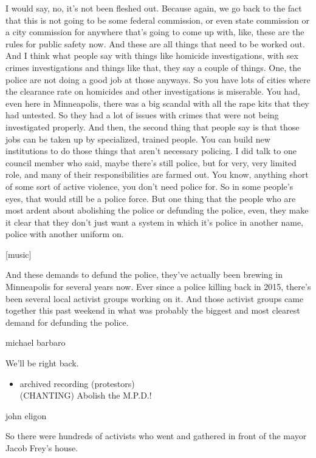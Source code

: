I would say, no, it's not been fleshed out. Because again, we go back to
the fact that this is not going to be some federal commission, or even
state commission or a city commission for anywhere that's going to come
up with, like, these are the rules for public safety now. And these are
all things that need to be worked out. And I think what people say with
things like homicide investigations, with sex crimes investigations and
things like that, they say a couple of things. One, the police are not
doing a good job at those anyways. So you have lots of cities where the
clearance rate on homicides and other investigations is miserable. You
had, even here in Minneapolis, there was a big scandal with all the rape
kits that they had untested. So they had a lot of issues with crimes
that were not being investigated properly. And then, the second thing
that people say is that those jobs can be taken up by specialized,
trained people. You can build new institutions to do those things that
aren't necessary policing. I did talk to one council member who said,
maybe there's still police, but for very, very limited role, and many of
their responsibilities are farmed out. You know, anything short of some
sort of active violence, you don't need police for. So in some people's
eyes, that would still be a police force. But one thing that the people
who are most ardent about abolishing the police or defunding the police,
even, they make it clear that they don't just want a system in which
it's police in another name, police with another uniform on.

{[}music{]}

And these demands to defund the police, they've actually been brewing in
Minneapolis for several years now. Ever since a police killing back in
2015, there's been several local activist groups working on it. And
those activist groups came together this past weekend in what was
probably the biggest and most clearest demand for defunding the police.

michael barbaro

We'll be right back.

\begin{itemize}
\tightlist
\item
  archived recording (protestors)\\
  (CHANTING) Abolish the M.P.D.!
\end{itemize}

john eligon

So there were hundreds of activists who went and gathered in front of
the mayor Jacob Frey's house.

